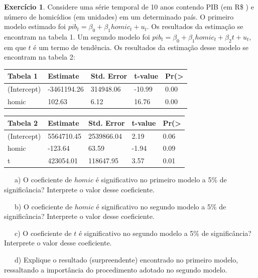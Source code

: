 \documentclass[
]{book}
\theoremstyle{definition}
\theoremstyle{definition}
\theoremstyle{definition}
\newtheorem{exercise}{Exercício}[chapter]
\theoremstyle{remark}
\begin{document}
\begin{exercise}
\protect\hypertarget{exr:exsr4}{}{\label{exr:exsr4} }Considere uma série temporal de 10 anos contendo PIB (em R\$ ) e número de homicídios (em unidades) em um determinado país. O primeiro modelo estimado foi \(pib_t=\beta_0+\beta_1homic_t+u_t\). Os resultados da estimação se encontram na tabela 1. Um segundo modelo foi \(pib_t=\beta_0+\beta_1homic_t+\beta_2t+u_t\), em que \(t\) é um termo de tendência. Os resultados da estimação desse modelo se encontram na tabela 2:

\begin{longtable}[]{@{}lllll@{}}
\toprule
Tabela 1 & Estimate & Std. Error & t-value & Pr(\textgreater{}\tabularnewline
\midrule
\endhead
(Intercept) & -3461194.26 & 314948.06 & -10.99 & 0.00\tabularnewline
homic & 102.63 & 6.12 & 16.76 & 0.00\tabularnewline
\bottomrule
\end{longtable}

\begin{longtable}[]{@{}lllll@{}}
\toprule
Tabela 2 & Estimate & Std. Error & t-value & Pr(\textgreater{}\tabularnewline
\midrule
\endhead
(Intercept) & 5564710.45 & 2539866.04 & 2.19 & 0.06\tabularnewline
homic & -123.64 & 63.59 & -1.94 & 0.09\tabularnewline
t & 423054.01 & 118647.95 & 3.57 & 0.01\tabularnewline
\bottomrule
\end{longtable}

~~~a) O coeficiente de \(homic\) é significativo no primeiro modelo a 5\% de significância? Interprete o valor desse coeficiente.

~~~b) O coeficiente de \(homic\) é significativo no segundo modelo a 5\% de significância? Interprete o valor desse coeficiente.

~~~c) O coeficiente de \(t\) é significativo no segundo modelo a 5\% de significância? Interprete o valor desse coeficiente.

~~~d) Explique o resultado (surpreendente) encontrado no primeiro modelo, ressaltando a importância do procedimento adotado no segundo modelo.
\end{exercise}
\end{document}
